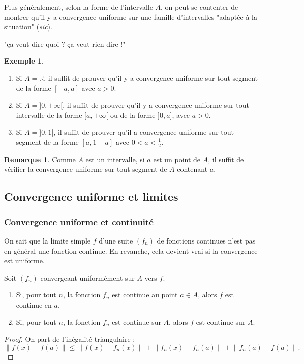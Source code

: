 \documentclass[french]{article}
\newcommand{\R}{\mathbb{R}}
\theoremstyle{plain}
\theoremstyle{definition}
\newtheorem*{ex}{Exemple}
\newtheorem*{rmq}{Remarque}
\theoremstyle{remark}
\begin{document}
Plus généralement, selon la forme de l'intervalle $A$, on peut se contenter de montrer qu'il y a convergence uniforme sur une famille d'intervalles "adaptée à la situation" (\textit{sic}).

"ça veut dire quoi ? ça veut rien dire !"

\begin{ex}
	\begin{enumerate}
		\item Si $A=\R$, il suffit de prouver qu'il y a convergence uniforme sur tout segment de la forme $[-a,a]$ avec $a>0$.
		\item Si $A=]0,+\infty[$, il suffit de prouver qu'il y a convergence uniforme sur tout intervalle de la forme $[a,+\infty[$ ou de la forme $]0,a]$, avec $a>0$.
		\item Si $A=]0,1[$, il suffit de prouver qu'il a convergence uniforme sur tout segment de la forme $[a,1-a]$ avec $0<a<\displaystyle\frac{1}{2}$.
	\end{enumerate}
\end{ex}

\begin{rmq}
	Comme $A$ est un intervalle, si $a$ est un point de $A$, il suffit de vérifier la convergence uniforme sur tout segment de $A$ contenant $a$.
\end{rmq}

\subsection{Convergence uniforme et limites}

\subsubsection*{Convergence uniforme et continuité}

On sait que la limite simple $f$ d'une suite $(f_n)$ de fonctions continues n'est pas en général une fonction continue. En revanche, cela devient vrai si la convergence est uniforme.

\begin{prop}%
	Soit $(f_n)$ convergeant uniformément sur $A$ vers $f$.
	\begin{enumerate}
		\item Si, pour tout $n$, la fonction $f_n$ est continue au point $a\in A$, alors $f$ est continue en $a$.
		\item Si, pour tout $n$, la fonction $f_n$ est continue sur $A$, alors $f$ est continue sur $A$.
	\end{enumerate}
\end{prop}
\begin{proof}
	On part de l'inégalité triangulaire :
	$$\lVert f(x)-f(a)\rVert\leqslant\lVert f(x)-f_n(x)\rVert+\lVert f_n(x)-f_n(a)\rVert+\lVert f_n(a)-f(a)\rVert.$$
\end{proof}
\end{document}
